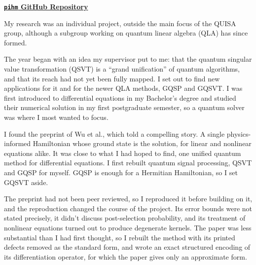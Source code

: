 
\noindent\href{\pihmrepo}{\textbf{\texttt{pihm} GitHub Repository}}\par\smallskip

My research was an individual project, outside the main focus of the QUISA group, although a subgroup working on quantum linear algebra (QLA) has since formed.

The year began with an idea my supervisor put to me: that the quantum singular value transformation (QSVT) is a ``grand unification'' of quantum algorithms, and that its reach had not yet been fully mapped. I set out to find new applications for it and for the newer QLA methods, GQSP and GQSVT. I was first introduced to differential equations in my Bachelor's degree and studied their numerical solution in my first postgraduate semester, so a quantum solver was where I most wanted to focus.

I found the preprint of Wu et al., which told a compelling story. A single physics-informed Hamiltonian whose ground state is the solution, for linear and nonlinear equations alike. It was close to what I had hoped to find, one unified quantum method for differential equations. I first rebuilt quantum signal processing, QSVT and GQSP for myself. GQSP is enough for a Hermitian Hamiltonian, so I set GQSVT aside.

The preprint had not been peer reviewed, so I reproduced it before building on it, and the reproduction changed the course of the project. Its error bounds were not stated precisely, it didn't discuss post-selection probability, and its treatment of nonlinear equations turned out to produce degenerate kernels. The paper was less substantial than I had first thought, so I rebuilt the method with its printed defects removed as the standard form, and wrote an exact structured encoding of its differentiation operator, for which the paper gives only an approximate form.


